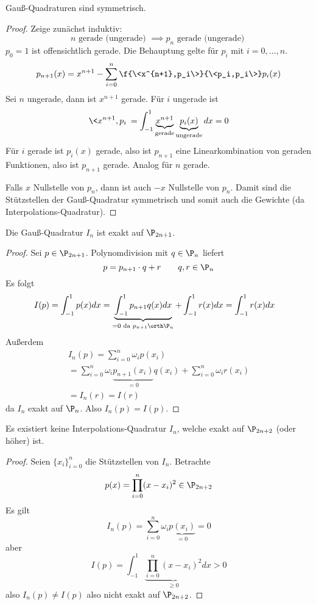 \documentclass[11pt]{scrbook}
\begin{document}
\begin{st}[Symmetrie]
	\label{2.20}
	Gauß-Quadraturen sind symmetrisch.
	\begin{proof}
		Zeige zunächst induktiv: 
		\[
			n \text{ gerade (ungerade) } \implies p_n \text{ gerade (ungerade) }
		\]
		$p_0 = 1$ ist offensichtlich gerade.
		Die Behauptung gelte für $p_i$ mit $i=0,\dotsc,n$.
		\[
			p_{n+1}(x) = x^{n+1} - \sum_{i=0}^n \f{\<x^{n+1},p_i\>}{\<p_i,p_i\>} p_i(x)
		\]
		Sei $n$ ungerade, dann ist $x^{n+1}$ gerade.
		Für $i$ ungerade ist
		\[
			\<x^{n+1},p_i\> = \int_{-1}^1 \underbrace{x^{n+1}}_{\text{gerade}} \underbrace{p_i(x)}_{\text{ungerade}} dx = 0
		\]
		Für $i$ gerade ist $p_i(x)$ gerade, also ist $p_{n+1}$ eine Linearkombination von geraden Funktionen, also ist $p_{n+1}$ gerade.
		Analog für $n$ gerade.

		Falls $x$ Nullstelle von $p_n$, dann ist auch $-x$ Nullstelle von $p_n$.
		Damit sind die Stützstellen der Gauß-Quadratur symmetrisch und somit auch die Gewichte (da Interpolations-Quadratur).
	\end{proof}
\end{st}

\begin{st}[Exaktheit]
	\label{2.21}
	Die Gauß-Quadratur $I_n$ ist exakt auf $\P_{2n+1}$.
	\begin{proof}
		Sei $p\in \P_{2n+1}$.
		Polynomdivision mit $q\in \P_n$ liefert
		\[
			p= p_{n+1} \cdot q + r \qquad  q,r\in \P_n
		\]
		Es folgt
		\begin{align*}
			I(p) 
			&= \int_{-1}^1 p(x) dx 
			= \underbrace{\int_{-1}^1 p_{n+1}q(x) dx}_{=0 \text{ da $p_{n+1}\orth \P_n$}} + \int_{-1}^1 r(x) dx
			= \int_{-1}^1 r(x) dx 
		\end{align*}
		Außerdem
		\begin{align*}
			I_n(p) 
			= \sum_{i=0}^n \omega_i p(x_i) \\
			= \sum_{i=0}^n \omega_i \underbrace{p_{n+1}(x_i)}_{=0} q(x_i) + \sum_{i=0}^n \omega_i r(x_i) \\
			= I_n(r) = I(r)
		\end{align*}
		da $I_n$ exakt auf $\P_n$.
		Also $I_n(p) = I(p)$.
	\end{proof}
\end{st}

\begin{st}
	\label{2.22}
	Es existiert keine Interpolations-Quadratur $I_n$, welche exakt auf $\P_{2n+2}$ (oder höher) ist.
	\begin{proof}
		Seien $\{x_i\}_{i=0}^n$ die Stützstellen von $I_n$.
		Betrachte 
		\[
			p(x) = \prod_{i=0}^n (x-x_i)^2 \in \P_{2n+2}
		\]
		Es gilt
		\[
			I_n(p) = \sum_{i=0}^n \omega_i \underbrace{p(x_i)}_{=0} = 0
		\]
		aber
		\[
			I(p) = \int_{-1}^1 \underbrace{\prod_{i=0}^n (x-x_i)^2 }_{\ge 0} dx > 0
		\]
		also $I_n(p) \neq I(p)$ also nicht exakt auf $\P_{2n+2}$.
	\end{proof}
\end{st}
\end{document}
